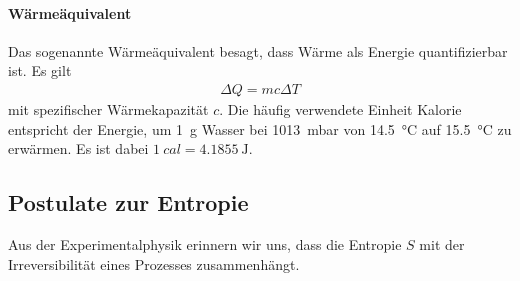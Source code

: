 \paragraph*{Wärmeäquivalent}

Das sogenannte Wärmeäquivalent besagt, dass Wärme als Energie quantifizierbar ist. Es gilt
\begin{align*}
    \Delta Q = mc\Delta T
\end{align*}
mit spezifischer Wärmekapazität $c$.
Die häufig verwendete Einheit Kalorie entspricht der Energie, um \SI{1}{\g} Wasser bei \SI{1013}{\milli\bar} von \SI{14,5}{\degreeCelsius} auf \SI{15,5}{\degreeCelsius} zu erwärmen. Es ist dabei $\SI{1}{cal} = \SI{4,1855}{\joule}$.



\subsection{Postulate zur Entropie}

Aus der Experimentalphysik erinnern wir uns, dass die Entropie $S$ mit der Irreversibilität eines Prozesses zusammenhängt. 

